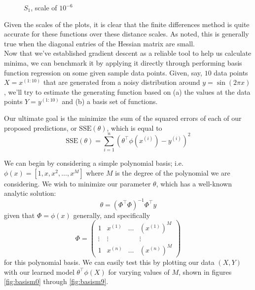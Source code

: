 \documentclass[11pt,letterpaper]{article}
\begin{document}
\begin{figure}[!htb]
  \caption{$S_1$, scale of $10^{-6}$}\label{fig:gradDifS}
\endminipage
\end{figure}

Given the scales of the plots, it is clear that the finite differences method is quite accurate for these functions over these distance scales. As noted, this is generally true when the diagonal entries of the Hessian matrix are small.\\

Now that we've established gradient descent as a reliable tool to help us calculate minima, we can benchmark it by applying it directly through performing basis function regression on some given sample data points. Given, say, $10$ data points $X = x^{(1:10)}$ that are generated from a noisy distribution around $y = \sin(2\pi x)$, we'll try to estimate the generating function based on (a) the values at the data points $Y = y^{(1:10)}$ and (b) a basis set of functions.

Our ultimate goal is the minimize the sum of the squared errors of each of our proposed predictions, or $\text{SSE}(\theta)$, which is equal to
\[ \text{SSE}(\theta) = \sum_{i=1}^n (\theta^\intercal\phi(x^{(i)}) - y^{(i)})^2 \]

We can begin by considering a simple polynomial basis; i.e. $\phi(x) = [1, x, x^2, \ldots , x^M]$ where $M$ is the degree of the polynomial we are considering. We wish to minimize our parameter $\theta$, which has a well-known analytic solution:
\[ \theta = (\Phi^\intercal\Phi)^{-1}\Phi^\intercal y \]
given that $\Phi = \phi(x)$ generally, and specifically
\[ \Phi = \left( \begin{array}{cccc}
 1 &  x^{(1)} & \ldots & (x^{(1)})^M \\
 \vdots & \vdots & & \vdots \\
 1 &  x^{(n)} & \ldots & (x^{(n)})^M \end{array} \right) \]
for this polynomial basis. We can easily test this by plotting our data $(X, Y)$ with our learned model $\theta^\intercal\phi(X)$ for varying values of $M$, shown in figures \ref{fig:basism0} through \ref{fig:basism9}.
\end{document}
